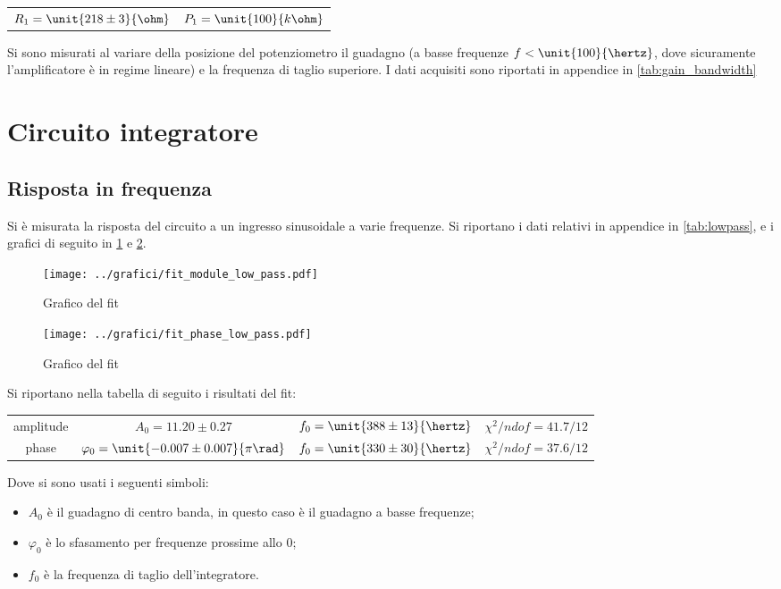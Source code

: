 \documentclass[10pt,a4paper]{article}
\begin{document}
\begin{table}[h!]
	\centering
	\begin{tabular}{cc}
		$R_1 = \unit{218 \pm 3}{\ohm}$  & $P_1 = \unit{100}{k\ohm}$
	\end{tabular}
\end{table}

Si sono misurati al variare della posizione del potenziometro il guadagno (a basse frequenze $f < \unit{100}{\hertz}$, dove sicuramente l'amplificatore è in regime lineare) e la frequenza di taglio superiore. I dati acquisiti sono riportati in appendice in \tablename{\ref{tab:gain_bandwidth}}

\section{Circuito integratore}

\subsection{Risposta in frequenza}
Si è misurata la risposta del circuito a un ingresso sinusoidale a varie frequenze. Si riportano i dati relativi in appendice in \tablename{\ref{tab:lowpass}}, e i grafici di seguito in \figurename{\ref{fig:lowamp}} e \figurename{\ref{fig:lowph}}.

\begin{figure}[h!]
	\centering
	\texttt{[image: ../grafici/fit\_module\_low\_pass.pdf]}
	\caption{Grafico del fit }
	\label{fig:lowamp}
\end{figure}
\begin{figure}[h!]
	\centering
	\texttt{[image: ../grafici/fit\_phase\_low\_pass.pdf]}
	\caption{Grafico del fit }
	\label{fig:lowph}
\end{figure}

Si riportano nella tabella di seguito i risultati del fit:

\begin{table}[h!]
\centering
\begin{tabular}{c|ccc}
amplitude	&	$A_0 = 11.20 \pm 0.27$	&	$f_0 = \unit{388 \pm 13}{\hertz}$	&	$\chi^2/ndof = 41.7 / 12$\\
phase		&	$\varphi_0 = \unit{-0.007 \pm 0.007}{\pi \rad}$	&	$f_0 = \unit{330 \pm 30}{\hertz}$	&	$\chi^2/ndof = 37.6 / 12$
\end{tabular}
\end{table}

\noindent Dove si sono usati i seguenti simboli:
\begin{itemize}
\item $A_0$ è il guadagno di centro banda, in questo caso è il guadagno a basse frequenze;
\item $\varphi_0$ è lo sfasamento per frequenze prossime allo 0;
\item $f_0$ è la frequenza di taglio dell'integratore.
\end{itemize}
\end{document}
